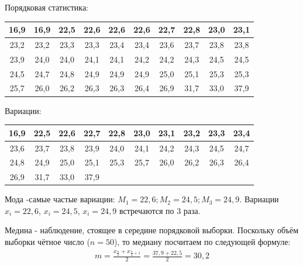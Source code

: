 \documentclass[utf8, a4paper, 14pt, russian, oneside]{book}
\begin{document}
Порядковая статистика:
\begin{table}[h!]
    \centering
    \begin{tabular}{|c|c|c|c|c|c|c|c|c|c|}
        \hline
        16,9 & 16,9 & 22,5 & 22,6 & 22,6 & 22,6 & 22,7 & 22,8 & 23,0 & 23,1\\
        \hline
        23,2 & 23,2 & 23,3 & 23,3 & 23,4 & 23,4 & 23,6 & 23,7 & 23,8 & 23,8\\
        \hline
        23,9 & 24,0 & 24,0 & 24,1 & 24,1 & 24,2 & 24,2 & 24,3 & 24,5 & 24,5\\
        \hline
        24,5 & 24,7 & 24,8 & 24,9 & 24,9 & 24,9 & 25,0 & 25,1 & 25,3 & 25,3\\
        \hline
        25,7 & 26,0 & 26,2 & 26,3 & 26,3 & 26,4 & 26,9 & 31,7 & 33,0 & 37,9\\
        \hline
    \end{tabular}
\end{table}

Вариации:
\begin{table}[h!]
    \centering
    \begin{tabular}{|c|c|c|c|c|c|c|c|c|c|}
        \hline
        16,9 & 22,5 & 22,6 & 22,7 & 22,8 & 23,0 & 23,1 & 23,2 & 23,3 & 23,4\\
        \hline
        23,6 & 23,7 & 23,8 & 23,9 & 24,0 & 24,1 & 24,2 & 24,3 & 24,5 & 24,7\\
        \hline
        24,8 & 24,9 & 25,0 & 25,1 & 25,3 & 25,7 & 26,0 & 26,2 & 26,3 & 26,4\\
        \hline
        26,9 & 31,7 & 33,0 & 37,9 & & & & & &\\
        \hline
    \end{tabular}
\end{table}

Мода -самые частые вариации: $M_1 = 22,6; M_2 = 24,5; M_3 = 24,9$. Вариации $x_i = 22,6$, $x_i=24,5$, $x_i = 24,9$ встречаются по 3 раза.

Медина - наблюдение, стоящее в середине порядковой выборки. Поскольку объём выборки чётное число ($n=50$), то медиану посчитаем по следующей формуле:
\begin{align*}
    m = \frac{x_{\tfrac{n}{2}} + x_{\tfrac{n}{2} + 1}}{2} = \frac{37,9 + 22,5}{2} = 30,2
\end{align*}
\end{document}

